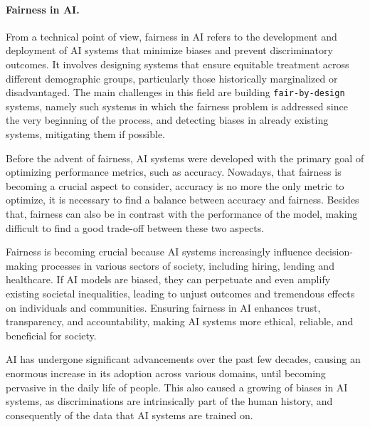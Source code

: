 \documentclass[12pt,a4paper,openright,twoside]{book}
\begin{document}
\paragraph{Fairness in \acs{AI}.}

From a technical point of view, fairness in \ac{AI} refers to the development and deployment of \ac{AI} systems that minimize biases and prevent discriminatory outcomes.
%
It involves designing systems that ensure equitable treatment across different demographic groups, particularly those historically marginalized or disadvantaged.
%
%
The main challenges in this field are building \texttt{fair-by-design} systems, namely such systems in which the fairness problem is addressed since the very beginning of the process, and detecting biases in already existing systems, mitigating them if possible.
%

Before the advent of fairness, \ac{AI} systems were developed with the primary goal of optimizing performance metrics, such as accuracy.
%
Nowadays, that fairness is becoming a crucial aspect to consider, accuracy is no more the only metric to optimize, it is necessary to find a balance between accuracy and fairness.
%
Besides that, fairness can also be in contrast with the performance of the model, making difficult to find a good trade-off between these two aspects.

Fairness is becoming crucial because \ac{AI} systems increasingly influence decision-making processes in various sectors of society, including hiring, lending and healthcare.
%
If \ac{AI} models are biased, they can perpetuate and even amplify existing societal inequalities, leading to unjust outcomes and tremendous effects on individuals and communities.
%
Ensuring fairness in \ac{AI} enhances trust, transparency, and accountability, making \ac{AI} systems more ethical, reliable, and beneficial for society.

\ac{AI} has undergone significant advancements over the past few decades, causing an enormous increase in its adoption across various domains, until becoming pervasive in the daily life of people.
%
This also caused a growing of biases in \ac{AI} systems, as discriminations are intrinsically part of the human history, and consequently of the data that \ac{AI} systems are trained on.
\end{document}
